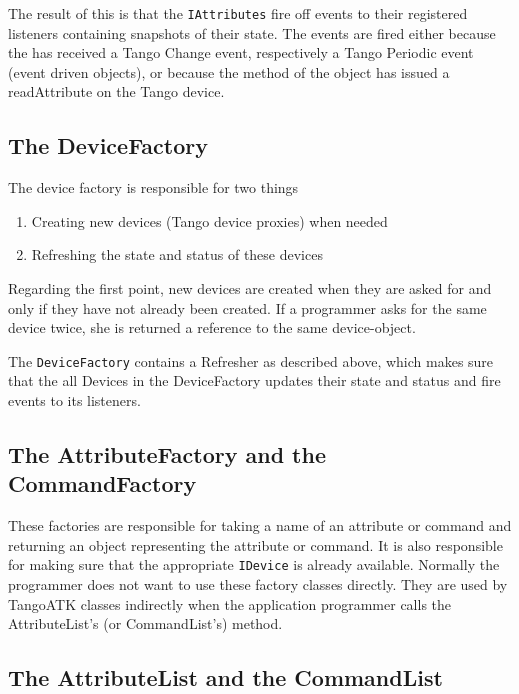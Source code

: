 The result of this is that the \texttt{IAttributes} fire off events
to their registered listeners containing snapshots
of their state. The events are fired either because the 
has received a Tango Change event, respectively a Tango Periodic event
(event driven objects), or because the  method of
the object has issued a readAttribute on the Tango device.

\subsection{The DeviceFactory}

The device factory is responsible for two things
\begin{enumerate}
\item Creating new devices (Tango device proxies) when needed 
\item Refreshing the state and status of these devices 
\end{enumerate}
Regarding the first point, new devices are created when they are asked
for and only if they have not already been created. If a programmer
asks for the same device twice, she is returned a reference to the
same device-object.

The \texttt{DeviceFactory} contains a Refresher as described above,
which makes sure that the all \textsf{Devices} in the \textsf{DeviceFactory}
updates their state and status and fire events to its listeners.

\subsection{The AttributeFactory and the CommandFactory}

These factories are responsible for taking a name of an attribute
or command and returning an object representing the attribute or command.
It is also responsible for making sure that the appropriate \texttt{IDevice}
is already available. Normally the programmer does not want to use
these factory classes directly. They are used by TangoATK classes
indirectly when the application programmer calls the AttributeList's
(or CommandList's)  method.

\subsection{The AttributeList and the CommandList}


